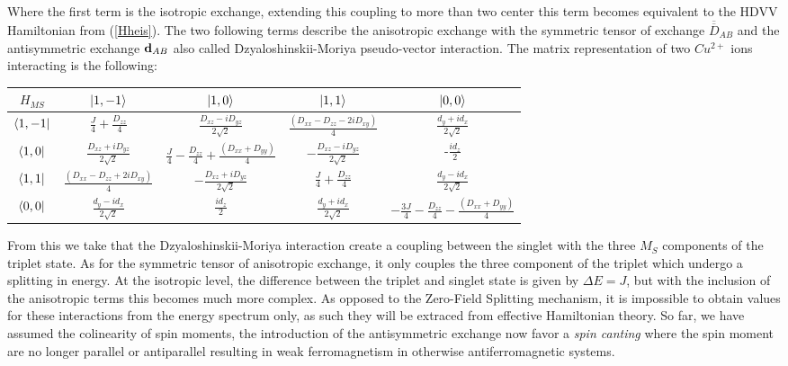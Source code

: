\documentclass[12pt]{article}
\numberwithin{equation}{section}
\begin{document}
Where the first term is the isotropic exchange, extending this coupling to more than two center this term becomes equivalent to the HDVV Hamiltonian from (\ref{Hheis}).%
The two following terms describe the anisotropic exchange with the symmetric tensor of exchange $\overline{\overline{D}}_{AB}$ and the antisymmetric exchange $\vb{d}_{AB}$ also called Dzyaloshinskii-Moriya pseudo-vector interaction.
The matrix representation of two $Cu^{2+}$ ions interacting is the following:
\begin{center}
    \begin{tabular}{c | c c c c}
        $H_{MS}$ & $\ket{1,-1}$ & $\ket{1,0}$ & $\ket{1,1}$ & $\ket{0,0}$\\
        \hline
        $\bra{1,-1}$ & $\frac{J}{4}+\frac{D_{zz}}{4}$ & $\frac{D_{xz}-iD_{yz}}{2\sqrt{2}}$ & $\frac{(D_{xx}-D_{zz}-2iD_{xy})}{4} $& $\frac{d_y+id_x}{2\sqrt{2}}$\\
        $\bra{1,0}$ & $\frac{D_{xz}+iD_{yz}}{2\sqrt{2}}$ &$ \frac{J}{4} -\frac{D_{zz}}{4} +\frac{(D_{xx}+D_{yy})}{4}$& $-\frac{D_{xz}-iD_{yz}}{2\sqrt{2}}$ & -$\frac{id_z}{2}$ \\
        $\bra{1,1}$ &$\frac{(D_{xx}-D_{zz}+2iD_{xy})}{4} $ & $-\frac{D_{xz}+iD_{yz}}{2\sqrt{2}}$ & $\frac{J}{4}+\frac{D_{zz}}{4}$ & $\frac{d_y-id_x}{2\sqrt{2}}$\\
        $\bra{0,0}$ & $\frac{d_y-id_x}{2\sqrt{2}}$  & $\frac{id_z}{2}$  &$\frac{d_y+id_x}{2\sqrt{2}}$  & $-\frac{3J}{4}-\frac{D_{zz}}{4}-\frac{(D_{xx}+D_{yy})}{4}$\\
    \end{tabular}
\end{center}
From this we take that the Dzyaloshinskii-Moriya interaction create a coupling between the singlet with the three $M_S$ components of the triplet state.
As for the symmetric tensor of anisotropic exchange, it only couples the three component of the triplet which undergo a splitting in energy.
At the isotropic level, the difference between the triplet and singlet state is given by $\Delta E=J$, but with the inclusion of the anisotropic terms this becomes much more complex. 
As opposed to the Zero-Field Splitting mechanism, it is impossible to obtain values for these interactions from the energy spectrum only, as such they will be extraced from effective Hamiltonian theory.
So far, we have assumed the colinearity of spin moments, the introduction of the antisymmetric exchange now favor a \textit{spin canting} where the spin moment are no longer parallel or antiparallel resulting in weak ferromagnetism in otherwise antiferromagnetic systems.
\end{document}
